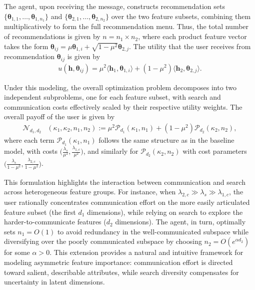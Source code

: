 \documentclass[12pt]{article}
\theoremstyle{definition}
\theoremstyle{remark}
\begin{document}
The agent, upon receiving the message, constructs recommendation sets $\{\boldsymbol{\theta}_{1,1}, \dots,  \boldsymbol{\theta}_{1,n_1}\}$ and $\{\boldsymbol{\theta}_{2,1}, \dots,  \boldsymbol{\theta}_{2,n_2}\}$ over the two feature subsets, combining them multiplicatively to form the full recommendation menu. Thus, the total number of recommendations is given by $n = n_1 \times n_2$, where each product feature vector takes the form $\boldsymbol{\theta}_{ij} = \mu \boldsymbol{\theta}_{1,i} + \sqrt{1-\mu^2} \boldsymbol{\theta}_{2,j}$. The utility that the user receives from recommendation $\boldsymbol{\theta}_{ij}$ is given by
\begin{align*}
    u(\mathbf{h} , \boldsymbol{\theta}_{ij}) = \mu^2\langle \mathbf{h}_1 , \boldsymbol{\theta}_{1,i} \rangle + (1-\mu^2) \langle \mathbf{h}_2 , \boldsymbol{\theta}_{2,j} \rangle.
\end{align*}

Under this modeling, the overall optimization problem decomposes into two independent subproblems, one for each feature subset, with search and communication costs effectively scaled by their respective utility weights. The overall payoff of the user is given by
\begin{align*}
    \mathcal{N}_{d_1,d_2} & (\kappa_1,\kappa_2 , n_1,n_2) := \mu^2 \mathcal{P}_{d_1}(\kappa_1, n_1) + (1-\mu^2)\mathcal{P}_{d_2}(\kappa_2, n_2),
\end{align*}
where each term $\mathcal{P}_{d_1}(\kappa_1, n_1)$ follows the same structure as in the baseline model, with costs $\big(\frac{\lambda_s}{\mu^2}, \frac{\lambda_{1,c}}{\mu^2} \big)$, and similarly for $\mathcal{P}_{d_2}(\kappa_2, n_2)$ with cost parameters $\big(\frac{\lambda_s}{1-\mu^2}, \frac{\lambda_{2,c}}{1-\mu^2} \big)$.

This formulation highlights the interaction between communication and search across heterogeneous feature groups. For instance, when $\lambda_{2,c} \gg \lambda_s \gg \lambda_{1,c}$, the user rationally concentrates communication effort on the more easily articulated feature subset (the first $d_1$ dimensions), while relying on search to explore the harder-to-communicate features ($d_2$ dimensions). The agent, in turn, optimally sets $n_1 = O(1)$ to avoid redundancy in the well-communicated subspace while diversifying over the poorly communicated subspace by choosing $n_2 = O(e^{\alpha d_2})$ for some $\alpha>0$. This extension provides a natural and intuitive framework for modeling asymmetric feature importance: communication effort is directed toward salient, describable attributes, while search diversity compensates for uncertainty in latent dimensions.
\end{document}
